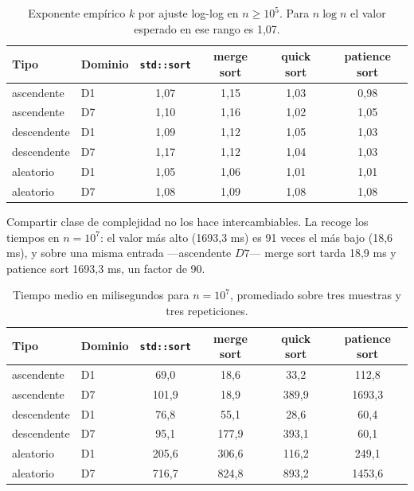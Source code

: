 \begin{table}[H]
  \centering
  \begin{tabular}{llcccc}
  \hline
  Tipo & Dominio & \texttt{std::sort} & merge sort & quick sort & patience sort \\
  \hline
  ascendente  & D1 & 1,07 & 1,15 & 1,03 & 0,98 \\
  ascendente  & D7 & 1,10 & 1,16 & 1,02 & 1,05 \\
  descendente & D1 & 1,09 & 1,12 & 1,05 & 1,03 \\
  descendente & D7 & 1,17 & 1,12 & 1,04 & 1,03 \\
  aleatorio   & D1 & 1,05 & 1,06 & 1,01 & 1,01 \\
  aleatorio   & D7 & 1,08 & 1,09 & 1,08 & 1,08 \\
  \hline
  \end{tabular}
  \caption{Exponente empírico $k$ por ajuste log-log en $n \geq 10^5$. Para
  $n \log n$ el valor esperado en ese rango es 1,07.}
  \label{tab:orden-exp}
\end{table}

Compartir clase de complejidad no los hace intercambiables. La
 recoge los tiempos en $n = 10^7$: el valor más alto
(1693,3 ms) es 91 veces el más bajo (18,6 ms), y sobre una misma entrada
---ascendente $D7$--- merge sort tarda 18,9 ms y patience sort 1693,3 ms, un
factor de 90.

\begin{table}[H]
  \centering
  \begin{tabular}{llcccc}
  \hline
  Tipo & Dominio & \texttt{std::sort} & merge sort & quick sort & patience sort \\
  \hline
  ascendente  & D1 &   69,0 &   18,6 &   33,2 &  112,8 \\
  ascendente  & D7 &  101,9 &   18,9 &  389,9 & 1693,3 \\
  descendente & D1 &   76,8 &   55,1 &   28,6 &   60,4 \\
  descendente & D7 &   95,1 &  177,9 &  393,1 &   60,1 \\
  aleatorio   & D1 &  205,6 &  306,6 &  116,2 &  249,1 \\
  aleatorio   & D7 &  716,7 &  824,8 &  893,2 & 1453,6 \\
  \hline
  \end{tabular}
  \caption{Tiempo medio en milisegundos para $n = 10^7$, promediado sobre tres
  muestras y tres repeticiones.}
  \label{tab:orden-tiempo}
\end{table}

